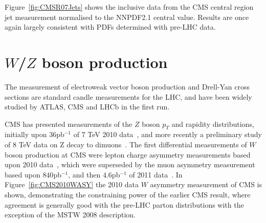 Figure~\ref{fig:CMSR07Jets} shows the inclusive data from the CMS central region jet measurement normalised to the NNPDF2.1 central value. Results are once again largely consistent with PDFs determined with pre-LHC data. 

%


\section{$W$/$Z$ boson production}

The measurement of electroweak vector boson production and Drell-Yan cross sections are standard candle measurements for the LHC, and have been widely studied by ATLAS, CMS and LHCb in the first run.

CMS has presented measurements of the $Z$ boson $p_T$ and rapidity distributions, initially upon $36$pb$^{-1}$ of $7$ TeV 2010 data~\cite{Chatrchyan:2011wt}, and more recently a preliminary
study of $8$ TeV data on Z decay to dimuons~\cite{CMS-PAS-SMP-12-025,CMS-PAS-SMP-13-013}. The first differential measurements of $W$ boson production at CMS were lepton charge asymmetry measurements
based upon 2010 data~\cite{Chatrchyan:2011jz}, which were superseded by the muon asymmetry measurement based upon $840$pb$^{-1}$, and then $4.6$pb$^{-1}$ of 2011 data~\cite{Chatrchyan:2012xt,Chatrchyan:2013mza}. In Figure~\ref{fig:CMS2010WASY}
the 2010 data $W$ asymmetry measurement of CMS is shown, demonstrating the constraining power of the earlier CMS result, where agreement is generally good with the pre-LHC parton distributions with the exception of the MSTW 2008 description.

